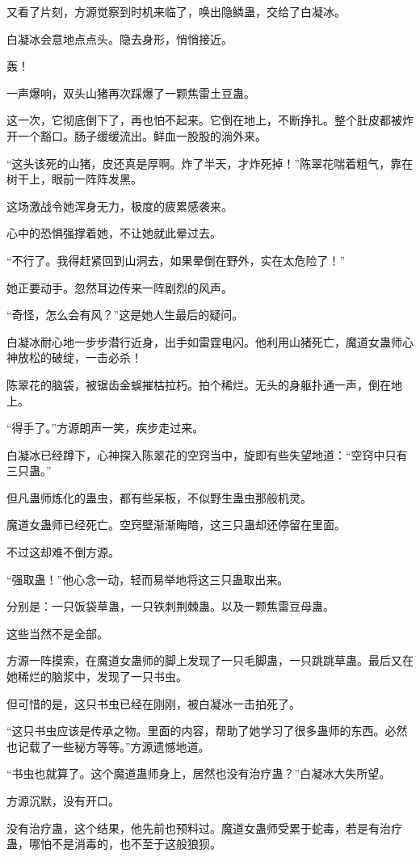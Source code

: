 \begin{this_body}
又看了片刻，方源觉察到时机来临了，唤出隐鳞蛊，交给了白凝冰。

白凝冰会意地点点头。隐去身形，悄悄接近。

轰！

一声爆响，双头山猪再次踩爆了一颗焦雷土豆蛊。

这一次，它彻底倒下了，再也怕不起来。它倒在地上，不断挣扎。整个肚皮都被炸开一个豁口。肠子缓缓流出。鲜血一股股的淌外来。

“这头该死的山猪，皮还真是厚啊。炸了半天，才炸死掉！”陈翠花喘着粗气，靠在树干上，眼前一阵阵发黑。

这场激战令她浑身无力，极度的疲累感袭来。

心中的恐惧强撑着她，不让她就此晕过去。

“不行了。我得赶紧回到山洞去，如果晕倒在野外，实在太危险了！”

她正要动手。忽然耳边传来一阵剧烈的风声。

“奇怪，怎么会有风？”这是她人生最后的疑问。

白凝冰耐心地一步步潜行近身，出手如雷霆电闪。他利用山猪死亡，魔道女蛊师心神放松的破绽，一击必杀！

陈翠花的脑袋，被锯齿金蜈摧枯拉朽。拍个稀烂。无头的身躯扑通一声，倒在地上。

“得手了。”方源朗声一笑，疾步走过来。

白凝冰已经蹲下，心神探入陈翠花的空窍当中，旋即有些失望地道：“空窍中只有三只蛊。”

但凡蛊师炼化的蛊虫，都有些呆板，不似野生蛊虫那般机灵。

魔道女蛊师已经死亡。空窍壁渐渐晦暗，这三只蛊却还停留在里面。

不过这却难不倒方源。

“强取蛊！”他心念一动，轻而易举地将这三只蛊取出来。

分别是：一只饭袋草蛊，一只铁刺荆棘蛊。以及一颗焦雷豆母蛊。

这些当然不是全部。

方源一阵摸索，在魔道女蛊师的脚上发现了一只毛脚蛊，一只跳跳草蛊。最后又在她稀烂的脑浆中，发现了一只书虫。

但可惜的是，这只书虫已经在刚刚，被白凝冰一击拍死了。

“这只书虫应该是传承之物。里面的内容，帮助了她学习了很多蛊师的东西。必然也记载了一些秘方等等。”方源遗憾地道。

“书虫也就算了。这个魔道蛊师身上，居然也没有治疗蛊？”白凝冰大失所望。

方源沉默，没有开口。

没有治疗蛊，这个结果，他先前也预料过。魔道女蛊师受累于蛇毒，若是有治疗蛊，哪怕不是消毒的，也不至于这般狼狈。


\end{this_body}
